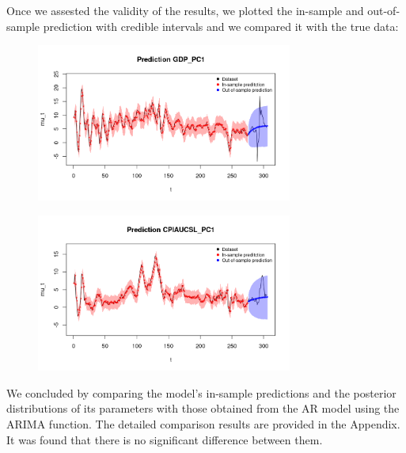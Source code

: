 Once we assested the validity of the results, we plotted the in-sample and out-of-sample prediction with credible intervals and we compared it with the true data: \\
\begin{figure}[H]
    \centering
    \includegraphics[width=0.75\textwidth]{images/2-AR/gdp_prediction.png}
    \label{fig:first}
\end{figure}
\begin{figure}[H]
    \centering
    \includegraphics[width=0.75\textwidth]{images/2-AR/infl_prediction.png}
    \label{fig:second}
\end{figure}
We concluded by comparing the model's in-sample predictions and the posterior distributions of its parameters with those obtained from the AR model using the ARIMA function. The detailed comparison results are provided in the Appendix. It was found that there is no significant difference between them.